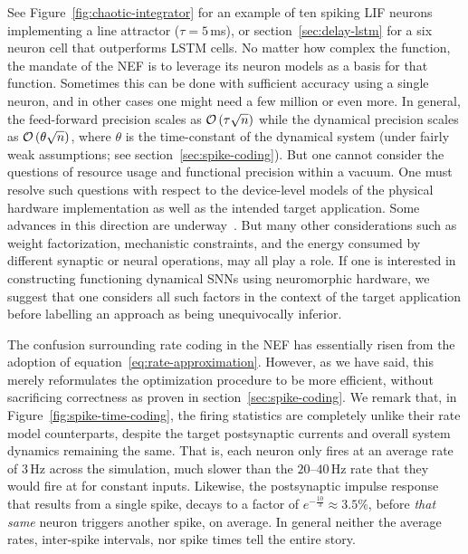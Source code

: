 See Figure~\ref{fig:chaotic-integrator} for an example of ten spiking LIF neurons implementing a line attractor ($\tau = 5$\,ms), or section~\ref{sec:delay-lstm} for a six neuron cell that outperforms LSTM cells.
No matter how complex the function, the mandate of the NEF is to leverage its neuron models as a basis for that function. 
Sometimes this can be done with sufficient accuracy using a single neuron, and in other cases one might need a few million or even more.
In general, the feed-forward precision scales as $\mathcal{O}\left({\tau \sqrt{n}}\right)$ while the dynamical precision scales as $\mathcal{O}\left({\theta \sqrt{n}}\right)$, where $\theta$ is the time-constant of the dynamical system (under fairly weak assumptions; see section~\ref{sec:spike-coding}).
But one cannot consider the questions of resource usage and functional precision within a vacuum.
One must resolve such questions with respect to the device-level models of the physical hardware implementation as well as the intended target application.
Some advances in this direction are underway~\citep{schwemmer2015constructing, thalmeier2016learning}.
But many other considerations such as weight factorization, mechanistic constraints, and the energy consumed by different synaptic or neural operations, may all play a role.
If one is interested in constructing functioning dynamical SNNs using neuromorphic hardware, we suggest that one considers all such factors in the context of the target application before labelling an approach as being unequivocally inferior.

The confusion surrounding rate coding in the NEF has essentially risen from the adoption of equation~\ref{eq:rate-approximation}.
However, as we have said, this merely reformulates the optimization procedure to be more efficient, without sacrificing correctness as proven in section~\ref{sec:spike-coding}.
We remark that, in Figure~\ref{fig:spike-time-coding}, the firing statistics are completely unlike their rate model counterparts, despite the target postsynaptic currents and overall system dynamics remaining the same.
That is, each neuron only fires at an average rate of $3$\,Hz across the simulation, much slower than the $20$--$40$\,Hz rate that they would fire at for constant inputs.
Likewise, the postsynaptic impulse response that results from a single spike, decays to a factor of $e^{-\frac{10}{3}} \approx 3.5\%$, before \emph{that same} neuron triggers another spike, on average.
In general neither the average rates, inter-spike intervals, nor spike times tell the entire story.

